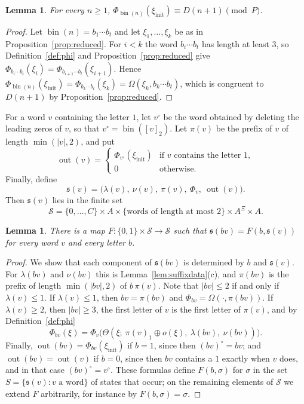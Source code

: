 \documentclass{amsart}
\newtheorem{lemma}[theorem]{Lemma}
\theoremstyle{definition}
\theoremstyle{remark}
\numberwithin{equation}{section}
\newcommand{\val}[1]{[#1]_2}
\newcommand{\bin}{\operatorname{bin}}
\newcommand{\out}{\operatorname{out}}
\newcommand{\st}{\mathfrak{s}}
\begin{document}
\begin{lemma}\label{lem:phi}
For every $n\ge1$, $\Phi_{\bin(n)}(\xi_{\mathrm{init}})\equiv D(n+1)\pmod P$.
\end{lemma}

\begin{proof}
Let $\bin(n)=b_1\cdots b_t$ and let $\xi_1,\dots,\xi_k$ be as in Proposition~\ref{prop:reduced}. For $i<k$ the word $b_i\cdots b_t$ has length at least $3$, so Definition~\ref{def:phi} and Proposition~\ref{prop:reduced} give $\Phi_{b_i\cdots b_t}(\xi_i)=\Phi_{b_{i+1}\cdots b_t}(\xi_{i+1})$. Hence $\Phi_{\bin(n)}(\xi_{\mathrm{init}})=\Phi_{b_k\cdots b_t}(\xi_k)=\Omega(\xi_k,b_k\cdots b_t)$, which is congruent to $D(n+1)$ by Proposition~\ref{prop:reduced}.
\end{proof}

For a word $v$ containing the letter $1$, let $v^\circ$ be the word obtained by deleting the leading zeros of $v$, so that $v^\circ=\bin(\val{v})$. Let $\pi(v)$ be the prefix of $v$ of length $\min(|v|,2)$, and put
\[
\out(v)=
\begin{cases}
\Phi_{v^\circ}(\xi_{\mathrm{init}})&\text{if $v$ contains the letter $1$},\\
0&\text{otherwise}.
\end{cases}
\]
Finally, define
\[
\st(v)=\bigl(\lambda(v),\ \nu(v),\ \pi(v),\ \Phi_v,\ \out(v)\bigr).
\]
Then $\st(v)$ lies in the finite set
\[
\mathcal S=\{0,\dots,C\}\times A\times\{\text{words of length at most }2\}\times A^{\Xi}\times A.
\]

\begin{lemma}\label{lem:transition}
There is a map $F\colon\{0,1\}\times\mathcal S\to\mathcal S$ such that $\st(bv)=F(b,\st(v))$ for every word $v$ and every letter $b$.
\end{lemma}

\begin{proof}
We show that each component of $\st(bv)$ is determined by $b$ and $\st(v)$. For $\lambda(bv)$ and $\nu(bv)$ this is Lemma~\ref{lem:suffixdata}(c), and $\pi(bv)$ is the prefix of length $\min(|bv|,2)$ of $b\,\pi(v)$. Note that $|bv|\le2$ if and only if $\lambda(v)\le1$. If $\lambda(v)\le1$, then $bv=\pi(bv)$ and $\Phi_{bv}=\Omega(\cdot,\pi(bv))$. If $\lambda(v)\ge2$, then $|bv|\ge3$, the first letter of $v$ is the first letter of $\pi(v)$, and by Definition~\ref{def:phi}
\[
\Phi_{bv}(\xi)=\Phi_v\bigl(\Theta(\xi;\ \pi(v)_1\oplus o(\xi),\ \lambda(bv),\ \nu(bv))\bigr).
\]
Finally, $\out(bv)=\Phi_{bv}(\xi_{\mathrm{init}})$ if $b=1$, since then $(bv)^\circ=bv$; and $\out(bv)=\out(v)$ if $b=0$, since then $bv$ contains a $1$ exactly when $v$ does, and in that case $(bv)^\circ=v^\circ$. These formulas define $F(b,\sigma)$ for $\sigma$ in the set $S=\{\st(v):v\text{ a word}\}$ of states that occur; on the remaining elements of $\mathcal S$ we extend $F$ arbitrarily, for instance by $F(b,\sigma)=\sigma$.
\end{proof}
\end{document}

